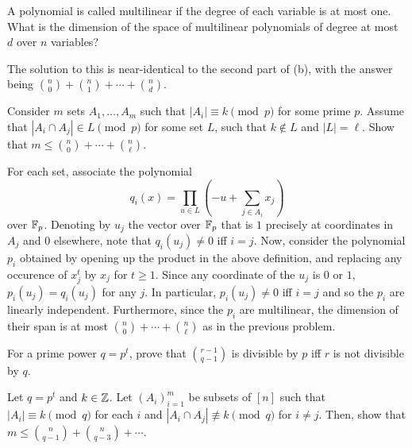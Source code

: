 \documentclass{article}
\begin{document}
	\begin{exercise}
		A polynomial is called multilinear if the degree of each variable is at most one. What is the dimension of the space of multilinear polynomials of degree at most $d$ over $n$ variables?
	\end{exercise}
	\begin{solution*}
		The solution to this is near-identical to the second part of (b), with the answer being $\binom{n}{0} + \binom{n}{1} + \cdots + \binom{n}{d}$.
	\end{solution*}

	\begin{exercise}
		Consider $m$ sets $A_1,\ldots,A_m$ such that $|A_i| \equiv k \pmod{p}$ for some prime $p$. Assume that $|A_i \cap A_j| \in L \pmod{p}$ for some set $L$, such that $k \not\in L$ and $|L| = \ell$. Show that $m \le \binom{n}{0}+\cdots+\binom{n}{\ell}$.
	\end{exercise}
	\begin{solution*}
		For each set, associate the polynomial
		\[ q_i(x) = \prod_{u \in L} \left( -u + \sum_{j \in A_i} x_j \right) \]
		over $\mathbb{F}_p$. Denoting by $u_j$ the vector over $\mathbb{F}_p$ that is $1$ precisely at coordinates in $A_j$ and $0$ elsewhere, note that $q_i(u_j) \ne 0$ iff $i = j$. Now, consider the polynomial $p_i$ obtained by opening up the product in the above definition, and replacing any occurence of $x_j^t$ by $x_j$ for $t \ge 1$. Since any coordinate of the $u_j$ is $0$ or $1$, $p_i(u_j) = q_i(u_j)$ for any $j$. In particular, $p_i(u_j) \ne 0$ iff $i = j$ and so the $p_i$ are linearly independent. Furthermore, since the $p_i$ are multilinear, the dimension of their span is at most $\binom{n}{0} + \cdots + \binom{n}{\ell}$ as in the previous problem.
	\end{solution*}

	\begin{exercise}
		For a prime power $q = p^t$, prove that $\binom{r-1}{q-1}$ is divisible by $p$ iff $r$ is not divisible by $q$.
	\end{exercise}
	\begin{solution*}
		
	\end{solution*}

	\begin{exercise}
		Let $q = p^t$ and $k \in \mathbb{Z}$. Let $(A_i)_{i=1}^m$ be subsets of $[n]$ such that $|A_i| \equiv k \pmod{q}$ for each $i$ and $|A_i \cap A_j| \not\equiv k \pmod{q}$ for $i \ne j$. Then, show that $m \le \binom{n}{q-1} + \binom{n}{q-3} + \cdots$.
	\end{exercise}
	\begin{solution*}
		
	\end{solution*}
\end{document}
